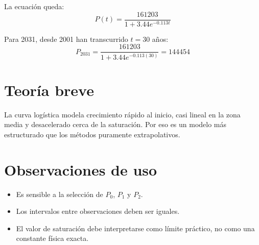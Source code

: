 \documentclass[12pt]{article}
\begin{document}
La ecuación queda:
\[
P(t)=\frac{\num{161203}}{1+3.44e^{-0.113t}}
\]

Para 2031, desde 2001 han transcurrido $t=30$ años:
\[
P_{2031}=\frac{\num{161203}}{1+3.44e^{-0.113(30)}}=\num{144454}
\]


\section{Teoría breve}
La curva logística modela crecimiento rápido al inicio, casi lineal en la zona media y desacelerado cerca de la saturación. Por eso es un modelo más estructurado que los métodos puramente extrapolativos.

\section{Observaciones de uso}
\begin{itemize}
\item Es sensible a la selección de $P_0$, $P_1$ y $P_2$.
\item Los intervalos entre observaciones deben ser iguales.
\item El valor de saturación debe interpretarse como límite práctico, no como una constante física exacta.
\end{itemize}
\end{document}
